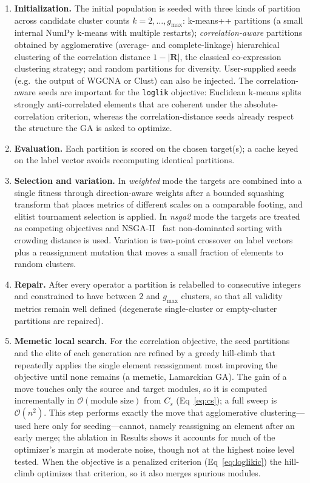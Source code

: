 \begin{enumerate}
\item \textbf{Initialization.} The initial population is seeded with three kinds
of partition across candidate cluster counts $k = 2,\dots,g_{\max}$: k-means++
partitions (a small internal NumPy k-means with multiple restarts);
\emph{correlation-aware} partitions obtained by agglomerative (average- and
complete-linkage) hierarchical clustering of the correlation distance
$1-\lvert\mathbf{R}\rvert$, the classical co-expression clustering strategy; and
random partitions for diversity. User-supplied seeds (e.g.\ the output of WGCNA
or Clust) can also be injected. The correlation-aware seeds are important for the
\texttt{loglik} objective: Euclidean k-means splits strongly anti-correlated
elements that are coherent under the absolute-correlation criterion, whereas the
correlation-distance seeds already respect the structure the GA is asked to
optimize.
\item \textbf{Evaluation.} Each partition is scored on the chosen target(s); a
cache keyed on the label vector avoids recomputing identical partitions.
\item \textbf{Selection and variation.} In \emph{weighted} mode the targets are
combined into a single fitness through direction-aware weights after a bounded
squashing transform that places metrics of different scales on a comparable
footing, and elitist tournament selection is applied. In \emph{nsga2} mode the
targets are treated as competing objectives and NSGA-II~\cite{Deb2002}
fast non-dominated sorting with crowding distance is used. Variation is two-point
crossover on label vectors plus a reassignment mutation that moves a small
fraction of elements to random clusters.
\item \textbf{Repair.} After every operator a partition is relabelled to
consecutive integers and constrained to have between $2$ and $g_{\max}$ clusters,
so that all validity metrics remain well defined (degenerate single-cluster or
empty-cluster partitions are repaired).
\item \textbf{Memetic local search.} For the correlation objective, the seed
partitions and the elite of each generation are refined by a greedy hill-climb
that repeatedly applies the single element reassignment most improving the
objective until none remains (a memetic, Lamarckian GA). The gain of a move
touches only the source and target modules, so it is computed incrementally in
$\mathcal{O}(\text{module size})$ from $C_s$ (Eq~\eqref{eq:cs}); a full sweep is
$\mathcal{O}(n^2)$. This step performs exactly the move that agglomerative clustering---used here only for seeding---cannot, namely reassigning an element after an early merge; the ablation in Results shows it accounts for much of the optimizer's margin at moderate noise, though not at the highest noise level tested. When the objective is a penalized
criterion (Eq~\eqref{eq:loglikic}) the hill-climb optimizes that criterion, so it
also merges spurious modules.
\end{enumerate}


